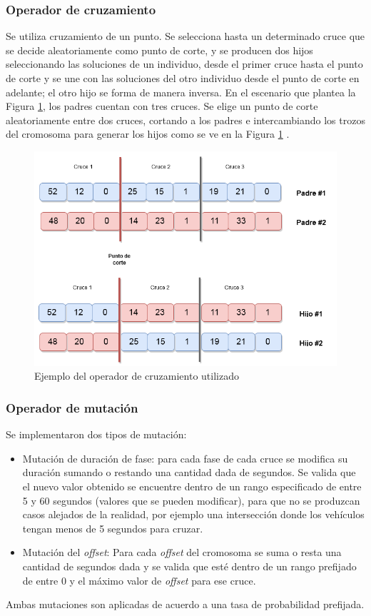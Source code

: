 \subsubsection{Operador de cruzamiento}
Se utiliza cruzamiento de un punto. Se selecciona hasta un determinado cruce que se decide aleatoriamente como punto de corte, y se producen dos hijos seleccionando las soluciones de un individuo, desde el primer cruce hasta el punto de corte y se une con las soluciones del otro individuo desde el punto de corte en adelante; el otro hijo se forma de manera inversa. En el escenario que plantea la Figura \ref{fig:op_cruzamiento}, los padres cuentan con tres cruces. Se elige un punto de corte aleatoriamente entre dos cruces, cortando a los padres e intercambiando los trozos del cromosoma para generar los hijos como se ve en la Figura \ref{fig:op_cruzamiento} . 

\begin{figure}[H]
	\centering
	\includegraphics[width=0.8\linewidth]{Figures/alg_cruzamiento}
	\caption{Ejemplo del operador de cruzamiento utilizado}
	\label{fig:op_cruzamiento}
\end{figure}



\subsubsection{Operador de mutación}
Se implementaron dos tipos de mutación:
\begin{itemize}
	
	\item Mutación de duración de fase: para cada fase de cada cruce se modifica su duración sumando o restando una cantidad dada de segundos. Se valida que el nuevo valor obtenido se encuentre dentro de un rango especificado de entre 5 y 60 segundos (valores que se pueden modificar), para que no se produzcan casos alejados de la realidad, por ejemplo una intersección donde los vehículos tengan menos de 5 segundos para cruzar.
	
	\item Mutación del \emph{offset}: Para cada \emph{offset} del cromosoma se suma o resta una cantidad de segundos dada y se valida que esté dentro de un rango prefijado de entre 0 y el máximo valor de \emph{offset} para ese cruce.
	

\end{itemize}
Ambas mutaciones son aplicadas de acuerdo a una tasa de probabilidad prefijada.

